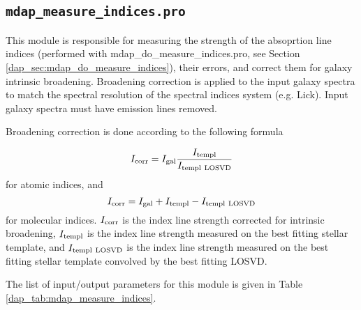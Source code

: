 \documentclass[11pt]{book}
\begin{document}
\subsection{{\tt mdap\_measure\_indices.pro}}
\label{dap_sec:mdap_measure_indices}

This module is responsible for measuring the strength of the
absoprtion line indices (performed with
mdap\_do\_measure\_indices.pro, see Section
\ref{dap_sec:mdap_do_measure_indices}), their errors, and correct them for galaxy
intrinsic broadening. Broadening correction is applied to the input
galaxy spectra to match the spectral resolution of the spectral
indices system (e.g. Lick). Input galaxy spectra must have emission
lines removed.

Broadening correction is done according to the following formula

\[
I_{\rm corr} = I_{\rm gal} \frac{I_{\rm templ}}{I_{\rm templ\ LOSVD}}
\]
for atomic indices, and 
\[
I_{\rm corr} = I_{\rm gal} + I_{\rm templ} - I_{\rm templ\ LOSVD}
\]
for molecular indices.  $I_{\rm corr}$ is the index line strength
corrected for intrinsic broadening, $I_{\rm templ}$ is the index line
strength measured on the best fitting stellar template, and $I_{\rm templ\
  LOSVD}$ is the index line strength measured on the best fitting
stellar template convolved by the best fitting LOSVD.

The list of input/output parameters for this module is given in Table
\ref{dap_tab:mdap_measure_indices}.
\end{document}
